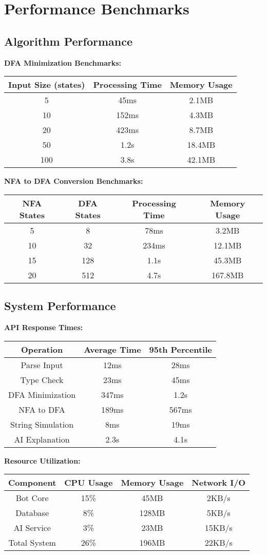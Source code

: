 \documentclass[12pt]{article}
\begin{document}
\section{Performance Benchmarks}

\subsection{Algorithm Performance}
\textbf{DFA Minimization Benchmarks:}
\begin{tabular}{|c|c|c|}
\hline
Input Size (states) & Processing Time & Memory Usage \\
\hline
5 & 45ms & 2.1MB \\
10 & 152ms & 4.3MB \\
20 & 423ms & 8.7MB \\
50 & 1.2s & 18.4MB \\
100 & 3.8s & 42.1MB \\
\hline
\end{tabular}

\textbf{NFA to DFA Conversion Benchmarks:}
\begin{tabular}{|c|c|c|c|}
\hline
NFA States & DFA States & Processing Time & Memory Usage \\
\hline
5 & 8 & 78ms & 3.2MB \\
10 & 32 & 234ms & 12.1MB \\
15 & 128 & 1.1s & 45.3MB \\
20 & 512 & 4.7s & 167.8MB \\
\hline
\end{tabular}

\subsection{System Performance}
\textbf{API Response Times:}
\begin{tabular}{|c|c|c|}
\hline
Operation & Average Time & 95th Percentile \\
\hline
Parse Input & 12ms & 28ms \\
Type Check & 23ms & 45ms \\
DFA Minimization & 347ms & 1.2s \\
NFA to DFA & 189ms & 567ms \\
String Simulation & 8ms & 19ms \\
AI Explanation & 2.3s & 4.1s \\
\hline
\end{tabular}

\textbf{Resource Utilization:}
\begin{tabular}{|c|c|c|c|}
\hline
Component & CPU Usage & Memory Usage & Network I/O \\
\hline
Bot Core & 15\% & 45MB & 2KB/s \\
Database & 8\% & 128MB & 5KB/s \\
AI Service & 3\% & 23MB & 15KB/s \\
Total System & 26\% & 196MB & 22KB/s \\
\hline
\end{tabular}
\end{document}
